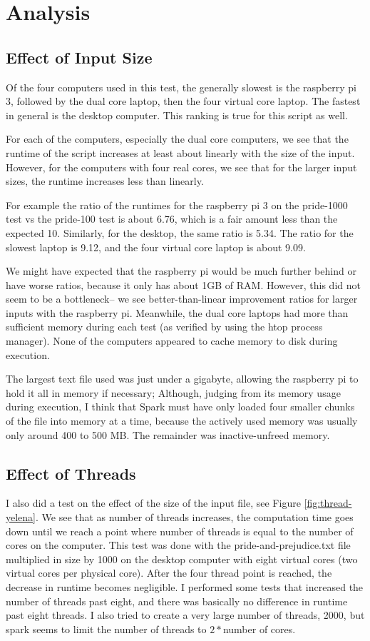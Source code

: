 \documentclass[12pt, letterpaper]{article}
\begin{document}
\section{Analysis}
\subsection{Effect of Input Size}

Of the four computers used in this test, the generally slowest is the raspberry pi 3, followed by the dual core laptop, then the four virtual core laptop. The fastest in general is the desktop computer. This ranking is true for this script as well.

For each of the computers, especially the dual core computers, we see that the runtime of the script increases at least about linearly with the size of the input. However, for the computers with four real cores, we see that for the larger input sizes, the runtime increases less than linearly.

For example the ratio of the runtimes for the raspberry pi 3 on the pride-1000 test vs the pride-100 test is about 6.76, which is a fair amount less than the expected 10. Similarly, for the desktop, the same ratio is 5.34. The ratio for the slowest laptop is 9.12, and the four virtual core laptop is about 9.09.

We might have expected that the raspberry pi would be much further behind or have worse ratios, because it only has about 1GB of RAM. However, this did not seem to be a bottleneck-- we see better-than-linear improvement ratios for larger inputs with the raspberry pi. Meanwhile, the dual core laptops had more than sufficient memory during each test (as verified by using the htop process manager). None of the computers appeared to cache memory to disk during execution.

The largest text file used was just under a gigabyte, allowing the raspberry pi to hold it all in memory if necessary; Although, judging from its memory usage during execution, I think that Spark must have only loaded four smaller chunks of the file into memory at a time, because the actively used memory was usually only around 400 to 500 MB. The remainder was inactive-unfreed memory.

\subsection{Effect of Threads}
I also did a test on the effect of the size of the input file, see Figure \ref{fig:thread-yelena}. We see that as number of threads increases, the computation time goes down until we reach a point where number of threads is equal to the number of cores on the computer. This test was done with the pride-and-prejudice.txt file multiplied in size by 1000 on the desktop computer with eight virtual cores (two virtual cores per physical core). After the four thread point is reached, the decrease in runtime becomes negligible. I performed some tests that increased the number of threads past eight, and there was basically no difference in runtime past eight threads. I also tried to create a very large number of threads, 2000, but spark seems to limit the number of threads to $2 * $number of cores.
\end{document}

